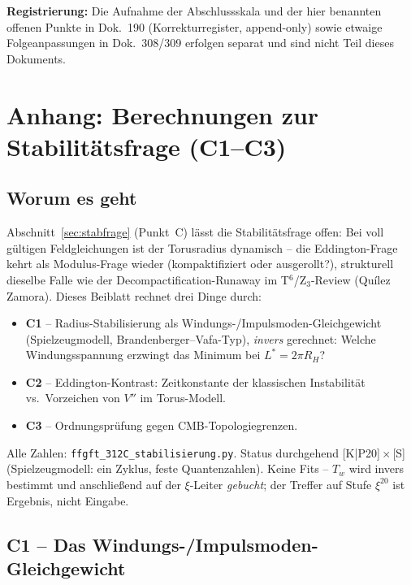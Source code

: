 \medskip
\noindent\textbf{Registrierung:} Die Aufnahme der Abschlussskala und
der hier benannten offenen Punkte in Dok.~190 (Korrekturregister,
append-only) sowie etwaige Folgeanpassungen in Dok.~308/309 erfolgen
separat und sind nicht Teil dieses Dokuments.


\appendix
\chapter{Anhang: Berechnungen zur Stabilitätsfrage (C1--C3)}
\label{app:stab}

\section*{Worum es geht}

Abschnitt~\ref{sec:stabfrage} (Punkt~C) lässt die Stabilitätsfrage offen: Bei
voll gültigen Feldgleichungen ist der Torusradius dynamisch -- die
Eddington-Frage kehrt als Modulus-Frage wieder (kompaktifiziert oder
ausgerollt?), strukturell dieselbe Falle wie der
Decompactification-Runaway im T$^6$/Z$_3$-Review (Quílez Zamora).
Dieses Beiblatt rechnet drei Dinge durch:

\begin{itemize}
  \item \textbf{C1} -- Radius-Stabilisierung als
        Windungs-/Impulsmoden-Gleichgewicht (Spielzeugmodell,
        Brandenberger--Vafa-Typ), \emph{invers} gerechnet: Welche
        Windungsspannung erzwingt das Minimum bei $L^{*} = 2\pi R_H$?
  \item \textbf{C2} -- Eddington-Kontrast: Zeitkonstante der
        klassischen Instabilität vs.\ Vorzeichen von $V''$ im
        Torus-Modell.
  \item \textbf{C3} -- Ordnungsprüfung gegen CMB-Topologiegrenzen.
\end{itemize}

Alle Zahlen: \texttt{ffgft\_312C\_stabilisierung.py}. Status
durchgehend [K|P20]\,$\times$\,[S] (Spielzeugmodell: ein Zyklus,
feste Quantenzahlen). Keine Fits -- $T_w$ wird invers bestimmt und
anschließend auf der $\xi$-Leiter \emph{gebucht}; der Treffer auf
Stufe $\xi^{20}$ ist Ergebnis, nicht Eingabe.

\section{C1 -- Das Windungs-/Impulsmoden-Gleichgewicht}

